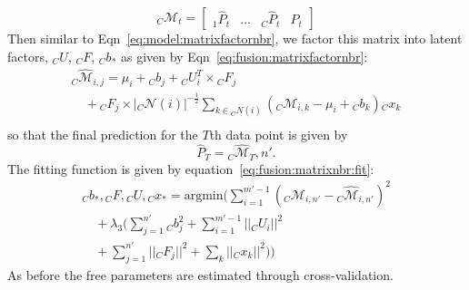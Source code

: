 \vspace{-1em}
\begin{equation}
  \label{eq:fusion:predictionmatrix}
  {}_C\mathcal{M}_{t} = \left[\begin{array}{llll}
      {}_1\widehat{P}_{t}& \dots & {}_C\widehat{P}_t & P_t 
    \end{array}
  \right]
\end{equation}
Then similar to Eqn~\ref{eq:model:matrixfactornbr}, we 
factor this matrix into latent factors, ${}_C U$, ${}_C F$, ${}_C b_*$ as 
given by Eqn~\ref{eq:fusion:matrixfactornbr}:
\vspace{-1em}
\begin{equation}
  \label{eq:fusion:matrixfactornbr}
  \begin{array}{l}
    {}_C \widehat{\mathcal{M}}_{i,j} =  \mu_i + {}_C b_{j} + {}_C U_i^T\times {}_C F_j \\
                                \quad + {}_C F_j \times |{}_C \mathcal{N}(i)|^{-\frac{1}{2}}
    \sum_{k \in {}_C N(i)} ({}_C\mathcal{M}_{i,k} - \mu_i + {}_C b_{k}) {}_Cx_k \\
  \end{array}
\end{equation}
so that the final prediction for the
$T$th data point is given by
\[\widehat{P}_T = {}_C \widehat{\mathcal{M}}_T,n'.\]
The fitting function is given by equation~\ref{eq:fusion:matrixnbr:fit}:
\begin{equation}
  \label{eq:fusion:matrixnbr:fit}
  \begin{array}{l}
    {}_C b_*, {}_C F, {}_C U, {}_C x_*  = \textrm{argmin} (\sum \limits_{i=1}^{m'-1} \left({}_C \mathcal{M}_{i,n'} - {}_C \widehat{\mathcal{M}}_{i,n'}   \right)^2 \\
     \quad + \lambda_3 (\sum \limits_{j=1}^{n'}{}_C b_j^2 + \sum \limits_{i=1}^{m'-1} ||{}_C U_i||^2 \\
     \quad+ \sum \limits_{j=1}^{n'} ||{}_C F_j||^2 + \sum_k ||{}_C x_k||^2))
  \end{array}
\end{equation}
\noindent
As before the free parameters are estimated through cross-validation.

